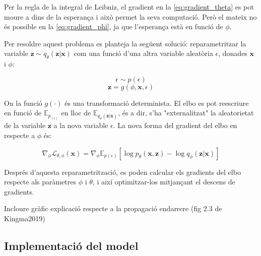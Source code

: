 \documentclass[CAT,BIB]{TFUOC}%
\newcommand{\todo}[1]{
            \begin{tcolorbox}[title=ToDo!, colback=red!5!white, colframe=red!50!black, coltext=red!50!black]
            #1
            \end{tcolorbox}}
\begin{document}
            Per la regla de la integral de Leibniz, el gradient en la \cref{eq:gradient_theta} es pot moure a dins de la esperança i això permet la seva computació. Però el mateix no és possible en la \cref{eq:gradient_phi}, ja que l'esperança està en funció de $\phi$.

            Per resoldre aquest problema es planteja la següent solució:
            reparametritzar la variable $\mathbf{z} \sim q_\theta(\mathbf{z|x})$
            com una funció d'una altra variable aleatòria $\epsilon$, donades $\mathbf{x}$ i $\phi$:

            \begin{equation}
            \label{eq:epsilon}
                \epsilon \sim p(\epsilon)
            \end{equation}
            \begin{equation}
            \label{eq:z_reparam}
                \mathbf{z} = g(\phi, \mathbf{x}, \epsilon)
            \end{equation}

            On la funció $g(\cdot)$ és una transformació determinista.
            El \gls{elbo} es pot reescriure
            en funció de $\mathbb{E}_{p_(\epsilon)}$
            en lloc de $\mathbb{E}_{q_\phi(\mathbf{z|x})}$,
            és a dir, s'ha "externalitzat" la aleatorietat de la variable $\mathbf{z}$
            a la nova variable $\epsilon$.
            La nova forma del gradient del \gls{elbo} en respecte a $\phi$ és:

            \begin{equation}
            \label{eq:gradient_phi_reparam}
                \nabla_\phi \mathcal{L}_{\theta,\phi}(\mathbf{x}) =
                \nabla_\phi \mathbb{E}_{p(\epsilon)} [
                    \log p_\theta(\mathbf{x,z}) -
                    \log q_\phi(\mathbf{z|x})
                ]
            \end{equation}

            Després d'aquesta reparametrització,
            es poden calcular els gradients del \gls{elbo}
            respecte als paràmetres $\phi$ i $\theta$,
            i així optimitzar-los mitjançant el descens de gradients.


\todo{Incloure gràfic explicació respecte a la propagació endarrere (fig 2.3 de Kingma2019) }

        \subsection{Implementació del model}
        \label{s:vae_implementacio}
\end{document}
